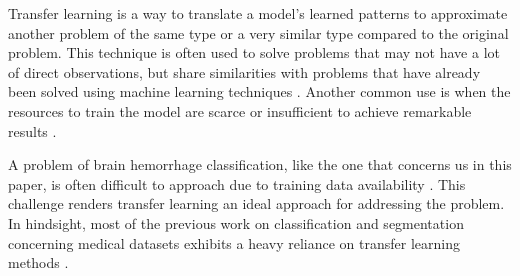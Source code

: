 Transfer learning is a way to translate a model's learned patterns to approximate another problem of the same type or a very similar type compared to the original problem. \cite{yosinski2014transferablefeaturesdeepneural} This technique is often used to solve problems that may not have a lot of direct observations, but share similarities with problems that have already been solved using machine learning techniques \cite{yosinski2014transferablefeaturesdeepneural}. Another common use is when the resources to train the model are scarce or insufficient to achieve remarkable results \cite{yosinski2014transferablefeaturesdeepneural}.

A problem of brain hemorrhage classification, like the one that concerns us in this paper, is often difficult to approach due to training data availability \cite{zhuang_2021_a}. This challenge renders transfer learning an ideal approach for addressing the problem. In hindsight, most of the previous work on classification and segmentation concerning medical datasets exhibits a heavy reliance on transfer learning methods \cite{zhuang_2021_a}.